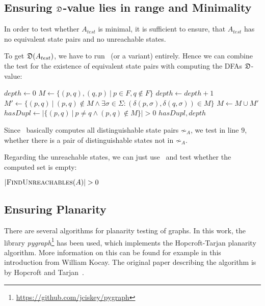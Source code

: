 \subsection{Ensuring \texorpdfstring{$\mathfrak{D}$}{D}-value lies in range and Minimality}

In order to test whether $A_{test}$ is minimal, it is sufficient to ensure, that $A_{test}$ has no equivalent state pairs and no unreachable states.

To get $\mathfrak{D}(A_{test})$, we have to run \CompDist\ (or a variant) entirely. Hence we can combine the test for the existence of equivalent state pairs with computing the DFAs $\mathfrak{D}$-value:
\vspace{0.2cm}
\begin{algorithmic}[1]
		\State $depth \gets 0$ 
		\State $M \gets \{ (p,q), (q,p)\ |\ p \in F, q \notin F \}$
		\Do
			\State $depth \gets depth + 1$
			\State $M' \gets \{ (p,q)\ |\ (p,q) \notin M \land \exists \sigma \in \Sigma \colon (\delta(p,\sigma), \delta(q,\sigma)) \in M \}$
			\State $M \gets M \cup M'$
		\State $hasDupl \gets | \{ (p,q)\ |\ p \neq q \land (p,q) \notin M \} | > 0$
		\State \Return $hasDupl, depth$
	\EndFunction
\end{algorithmic}
\vspace{0.2cm}
Since \CompDist\ basically computes all distinguishable state pairs $\not\sim_A$, we test in line $9$, whether there is a pair of distinguishable states not in $\not\sim_A$.

Regarding the unreachable states, we can just use \CompUnr\ and test whether the computed set is empty:
\vspace{0.2cm}
\begin{algorithmic}[1]
	\State \Return $|\textsc{FindUnreachables}(A)| > 0$
	\EndFunction
\end{algorithmic}

\subsection{Ensuring Planarity}\label{ch:3:sec:planarity}

There are several algorithms for planarity testing of graphs. In this work, the library \emph{pygraph}\footnote{\url{https://github.com/jciskey/pygraph}} has been used, which implements the Hopcroft-Tarjan planarity algorithm. More information on this can be found for example in this~\cite{Koc93} introduction from William Kocay. The original paper describing the algorithm is by Hopcroft and Tarjan~\cite{HT74}.

